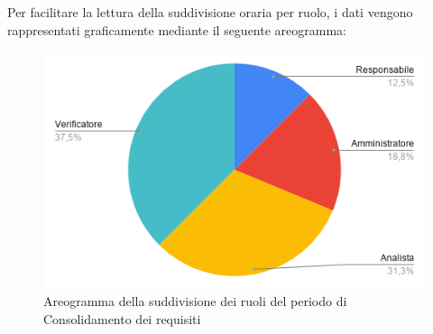 \documentclass[../piano-di-progetto.tex]{subfiles}
\begin{document}
  Per facilitare la lettura della suddivisione oraria per ruolo, i dati vengono rappresentati graficamente mediante il seguente areogramma:
  \begin{figure}[H]
    \centering
    \includegraphics[width=12cm]{img/ruoli-consolidamento.png}
    \caption{Areogramma della suddivisione dei ruoli del periodo di Consolidamento dei requisiti}
    \label{fig:ore-ruolo-consolidamento}
  \end{figure}
\end{document}
